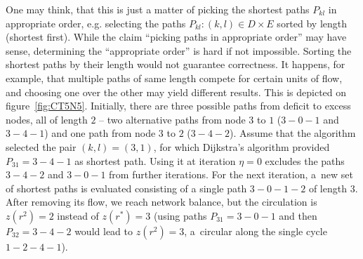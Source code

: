 \documentclass[paper=a4,parskip=half,DIV=12]{leetcode}
\begin{document}
One may think, that this is just a matter of picking the shortest paths
$P_{kl}$ in appropriate order, e.g. selecting the paths $P_{kl}: (k,l) \in D
\times E$ sorted by length (shortest first). While the claim ``picking paths in
appropriate order'' may have sense, determining the ``appropriate order'' is
hard if not impossible. Sorting the shortest paths by their length would not
guarantee correctness. It happens, for example, that multiple paths of same
length compete for certain units of flow, and choosing one over the other may
yield different results. This is depicted on figure~\ref{fig:CT5N5}. Initially,
there are three possible paths from deficit to excess nodes, all of length $2$
-- two alternative paths from node $3$ to $1$ ($3-0-1$ and $3-4-1$) and one
path from node $3$ to $2$ ($3-4-2$). Assume that the algorithm selected the
pair $(k,l) = (3,1)$, for which Dijkstra's algorithm provided $P_{31} = 3-4-1$
as shortest path. Using it at iteration $\eta=0$ excludes the paths $3-4-2$ and
$3-0-1$ from further iterations. For the next iteration, a~new set of shortest
paths is evaluated consisting of a single path $3-0-1-2$ of length $3$. After
removing its flow, we reach network balance, but the circulation is $z(r^2) = 2$
instead of $z(r^{*})=3$ (using paths $P_{31} = 3-0-1$ and then $P_{32} = 3-4-2$
would lead to $z(r^2)=3$, a~circular along the single cycle $1-2-4-1$).
\end{document}
